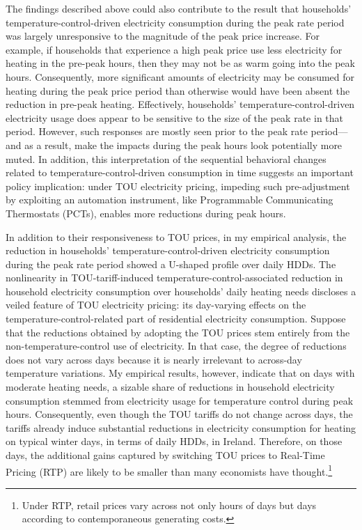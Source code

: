 The findings described above could also contribute to the result that households' temperature-control-driven electricity consumption during the peak rate period was largely unresponsive to the magnitude of the peak price increase. For example, if households that experience a high peak price use less electricity for heating in the pre-peak hours, then they may not be as warm going into the peak hours. Consequently, more significant amounts of electricity may be consumed for heating during the peak price period than otherwise would have been absent the reduction in pre-peak heating. Effectively, households' temperature-control-driven electricity usage does appear to be sensitive to the size of the peak rate in that period. However, such responses are mostly seen prior to the peak rate period---and as a result, make the impacts during the peak hours look potentially more muted. In addition, this interpretation of the sequential behavioral changes related to temperature-control-driven consumption in time suggests an important policy implication: under TOU electricity pricing, impeding such pre-adjustment by exploiting an automation instrument, like Programmable Communicating Thermostats (PCTs), enables more reductions during peak hours.

In addition to their responsiveness to TOU prices, in my empirical analysis, the reduction in households' temperature-control-driven electricity consumption during the peak rate period showed a U-shaped profile over daily HDDs. The nonlinearity in TOU-tariff-induced temperature-control-associated reduction in household electricity consumption over households' daily heating needs discloses a veiled feature of TOU electricity pricing: its day-varying effects on the temperature-control-related part of residential electricity consumption. Suppose that the reductions obtained by adopting the TOU prices stem entirely from the non-temperature-control use of electricity. In that case, the degree of reductions does not vary across days because it is nearly irrelevant to across-day temperature variations. My empirical results, however, indicate that on days with moderate heating needs, a sizable share of reductions in household electricity consumption stemmed from electricity usage for temperature control during peak hours. Consequently, even though the TOU tariffs do not change across days, the tariffs already induce substantial reductions in electricity consumption for heating on typical winter days, in terms of daily HDDs, in Ireland. Therefore, on those days, the additional gains captured by switching TOU prices to Real-Time Pricing (RTP) are likely to be smaller than many economists have thought.\footnote{Under RTP, retail prices vary across not only hours of days but days according to contemporaneous generating costs.} 

